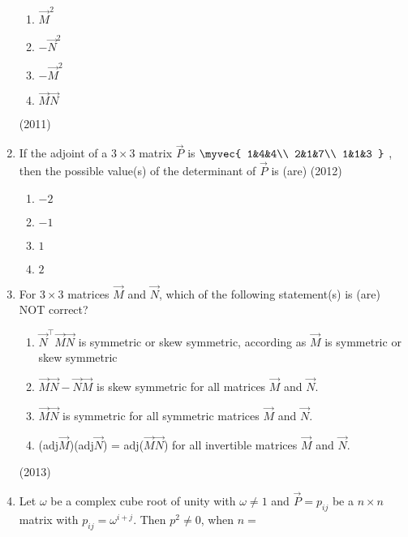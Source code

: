 \begin{enumerate}
\begin{multicols}{4}
        \begin{enumerate}
            \item $\vec{M}^2$
            \item $-\vec{N}^2$
            \item $-\vec{M}^2$
            \item $\vec{M}\vec{N}$
        \end{enumerate}
\end{multicols}
        \hfill (2011)
    \item 
        If the adjoint of a $3 \times 3$ matrix $\vec{P}$ is 
                $\myvec{	
                    1&4&4\\
                    2&1&7\\
                    1&1&3
                }$
        , then the possible value(s) of the determinant of $\vec{P}$ is (are)
            \hfill (2012)
\begin{multicols}{4}
            \begin{enumerate}
                \item $-2$
                \item $-1$
                \item $1$
                \item $2$
            \end{enumerate}
\end{multicols}
    \item 
        For $3 \times 3$ matrices $\vec{M}$ and $\vec{N}$, which of the following statement(s) is (are) NOT correct?
            \begin{enumerate}
                \item $\vec{N}^{\top}\vec{M}\vec{N}$ is symmetric or skew symmetric, according as $\vec{M}$ is symmetric or skew symmetric
                \item $\vec{M}\vec{N}-\vec{N}\vec{M}$ is skew symmetric for all matrices $\vec{M}$ and $\vec{N}$.
                \item $\vec{M}\vec{N}$ is symmetric for all symmetric matrices $\vec{M}$ and $\vec{N}$.
                \item (adj$\vec{M}$)(adj$\vec{N}$) = adj($\vec{M}\vec{N}$) for all invertible matrices $\vec{M}$ and $\vec{N}$.
            \end{enumerate}
            \hfill (2013)
    \item 
        Let $\omega$ be a complex cube root of unity with $\omega \neq 1 $ and $\vec{P}={p_{ij}}$ be a $n \times n$ matrix with $p_{ij} = \omega^{i+j}$. Then $p^2 \neq 0$, when $n=$

\end{enumerate}
